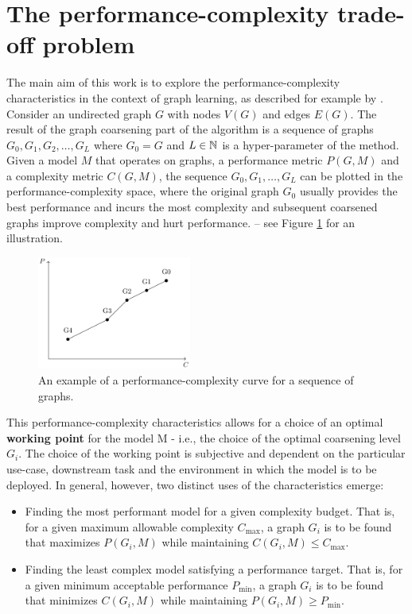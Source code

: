 \section{The performance-complexity trade-off problem}

The main aim of this work is to explore the performance-complexity characteristics in the context of graph learning, as described for example by \cite{prochazka_downstream_2022}. Consider an undirected graph \( G \) with nodes \( V \left( G \right) \) and edges \( E \left( G \right) \). The result of the graph coarsening part of the algorithm is a sequence of graphs \( G_0, G_1, G_2, \dots, G_L \) where \( G_0 = G \) and \( L \in \mathbb{N} \) is a hyper-parameter of the method.
Given a model \( M \) that operates on graphs, a performance metric \( P \left( G, M \right) \) and a complexity metric \( C \left( G, M \right) \), the sequence \( G_0, G_1, \dots, G_L \) can be plotted in the performance-complexity space, where the original graph \( G_0 \) usually provides the best performance and incurs the most complexity and subsequent coarsened graphs improve complexity and hurt performance. -- see Figure \ref{fig:performance-complexity} for an illustration.

\begin{figure}
  \centering
  \includegraphics[width=0.45\textwidth]{images/performance-complexity/performance-complexity.pdf}
  \caption{An example of a performance-complexity curve for a sequence of graphs.}
  \label{fig:performance-complexity}
\end{figure}

This performance-complexity characteristics allows for a choice of an optimal \textbf{working point} for the model M - i.e., the choice of the optimal coarsening level \( G_i \). The choice of the working point is subjective and dependent on the particular use-case, downstream task and the environment in which the model is to be deployed. In general, however, two distinct uses of the characteristics emerge:
\begin{itemize}
  \item Finding the most performant model for a given complexity budget. That is, for a given maximum allowable complexity \( C_\mathrm{max} \), a graph \( G_i \) is to be found that maximizes \( P \left( G_i, M \right) \) while maintaining \( C \left( G_i, M \right) \leq C_\mathrm{max} \).
  \item Finding the least complex model satisfying a performance target. That is, for a given minimum acceptable performance \( P_\mathrm{min} \), a graph \( G_i \) is to be found that minimizes \( C \left( G_i, M \right) \) while maintaining \( P \left( G_i, M \right) \geq P_\mathrm{min} \).
\end{itemize}

